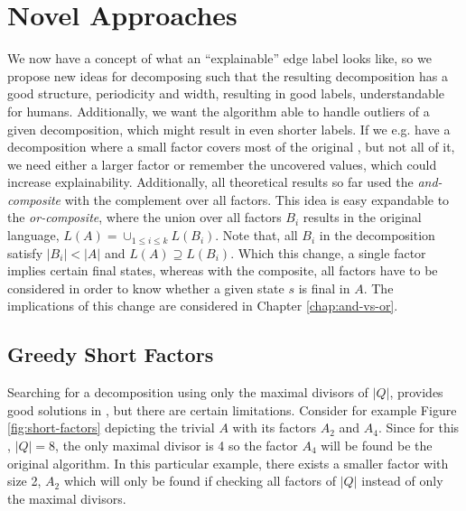 \chapter{Novel Approaches}
\label{chap:novel-algos}
We now have a concept of what an \enquote{explainable} edge label looks like, so we propose new ideas for decomposing \DFAs such that the resulting decomposition has a good structure, periodicity and width, resulting in good labels, understandable for humans. Additionally, we want the algorithm able to handle outliers of a given decomposition, which might result in even shorter labels. If we e.g. have a decomposition where a small factor covers most of the original \DFA, but not all of it, we need either a larger factor or remember the uncovered values, which could increase explainability. Additionally, all theoretical results so far used the \textit{and-composite} with the complement over all factors. This idea is easy expandable to the \textit{or-composite}, where the union over all factors $B_i$ results in the original language, $L(A) = \cup_{1\leq i \leq k} L(B_i)$. Note that, all $B_i$ in the decomposition satisfy $|B_i| < |A|$ and $L(A) \supseteq L(B_i)$. Which this change, a single factor implies certain final states, whereas with the composite, all factors have to be considered in order to know whether a given state $s$ is final in $A$. The implications of this change are considered in Chapter \ref{chap:and-vs-or}.

\section{Greedy Short Factors}
\label{ch:novel-algos:greedy-short-factors}
Searching for a decomposition using only the maximal divisors of $|Q|$, provides good solutions in \LogSpace, but there are certain limitations. Consider for example Figure \ref{fig:short-factors} depicting the trivial \DFA $A$ with its factors $A_2$ and $A_4$. Since for this \DFA, $|Q| = 8$, the only maximal divisor is 4 so the factor $A_4$ will be found be the original algorithm. In this particular example, there exists a smaller factor with size 2, $A_2$ which will only be found if checking all factors of $|Q|$ instead of only the maximal divisors.


